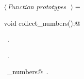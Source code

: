 \documentclass{report}
\begin{document}
\begin{flushleft} \small
\begin{minipage}{\linewidth} \label{scrap187}
$\langle\,${\it Function prototypes}\nobreak\ {\footnotesize {}}$\,\rangle\equiv$
\vspace{-1ex}
\begin{list}{}{} \item
\mbox{}\verb@extern void collect_numbers();@\\
\mbox{}\verb@@{\NWsep}
\end{list}
\vspace{-1ex}
\footnotesize\addtolength{\baselineskip}{-1ex}
\begin{list}{}{\setlength{\itemsep}{-\parsep}\setlength{\itemindent}{-\leftmargin}}
\item \NWtxtMacroDefBy\ .
\item \NWtxtMacroRefIn\ .
\end{list}
\vspace{-2ex}
\footnotesize\addtolength{\baselineskip}{-1ex}
\begin{list}{}{\setlength{\itemsep}{-\parsep}\setlength{\itemindent}{-\leftmargin}}
\item \NWtxtIdentsUsed\nobreak\  \verb@collect_numbers@\nobreak\ .\end{list}
\end{minipage}\\[4ex]
\end{flushleft}
\end{document}

